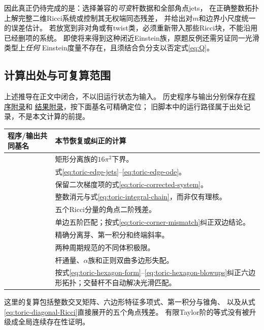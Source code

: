 \documentclass[UTF8,a4paper,11pt,fontset=fandol]{ctexart}
\numberwithin{equation}{section}
\theoremstyle{definition}
\begin{document}
因此真正仍待完成的是：选择兼容的\emph{可变}杆数据和全部角点jets，
在正确整数拓扑上解完整二维Ricci系统或控制其无权端同态残差，
并给出对$m$和边界小尺度统一的误差估计。
若放宽到非对角或有twist类，必须重新带入那些Ricci块，不能沿用已经删项的系统。
即使将来得到这种闭近Einstein族，原题反例还需另证同一光滑类型上\emph{任何}
Einstein度量不存在，且须结合负分支以否定式\eqref{eq:Q}。

\subsection{计算出处与可复算范围}\label{sec:toric-provenance}
上述推导在正文中闭合，不以旧运行状态为输入。
历史程序与输出分别保存在\href{../references/computations.md}{程序附录}和
\href{../references/experiments.md}{结果附录}，按下面基名可精确定位；
旧脚本中的运行路径属于出处记录，不是本文计算的前提。
\begin{longtable}{L{.56\textwidth}L{.32\textwidth}}
\toprule 程序/输出共同基名 & 本节恢复或纠正的计算\\\midrule\endhead
{} & 矩形分离族的$16\pi^2$下界。\\
 & 式\eqref{eq:toric-edge-jets}--\eqref{eq:toric-edge-ode}。\\
 & 保留二次梯度项的式\eqref{eq:toric-corrected-system}。\\
 & 整数消元与式\eqref{eq:toric-integral-chain}，而非仅有理核。\\
 & 五个Ricci分量的角点二阶残差。\\
 & 单边五阶匹配；按式\eqref{eq:toric-corner-mismatch}纠正双边结论。\\
 & 精确分离芽、第一积分和终端斜率。\\
 & 两种周期规范的不同体积极限。\\
 & 杆通量、$\alpha$族和正则双曲多边形失配。\\
 & 按式\eqref{eq:toric-hexagon-form}--\eqref{eq:toric-hexagon-blowups}纠正六边形拓扑；交替杆不自动解决光滑匹配。\\\bottomrule
\end{longtable}
这里的复算包括整数交叉矩阵、六边形特征多项式、第一积分与锥角、
以及从式\eqref{eq:toric-diagonal-Ricci}直接展开的五个角点残差。
有限Taylor阶的等式没有被升级成全局连续存在性证明。
\end{document}
